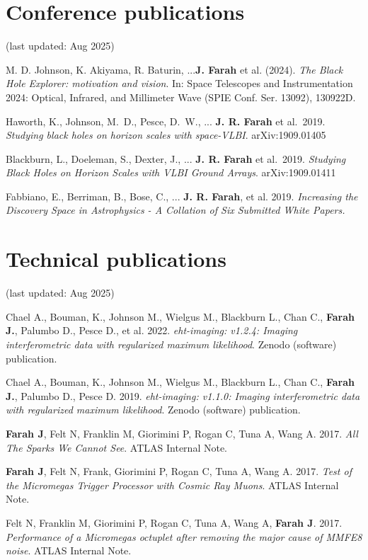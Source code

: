 \documentclass[margin,line]{res}
\begin{document}
\begin{resume}
\vspace{+.4cm}
\section{\sc Conference publications}
(last updated: Aug 2025)

M. D. Johnson, K. Akiyama, R. Baturin, ...\textbf{J. Farah} et al. (2024). \textit{The Black Hole Explorer: motivation and vision}. In: Space Telescopes and Instrumentation 2024: Optical, Infrared, and Millimeter Wave (SPIE Conf. Ser. 13092), 130922D.

Haworth, K., Johnson, M.~D., Pesce, D.~W., ... \textbf{J. R. Farah}  et al.\ 2019. \textit{Studying black holes on horizon scales with space-VLBI}. arXiv:1909.01405 

Blackburn, L., Doeleman, S., Dexter, J., ... \textbf{J. R. Farah} et al.\ 2019. \textit{Studying Black Holes on Horizon Scales with VLBI Ground Arrays}. arXiv:1909.01411 

Fabbiano, E., Berriman, B., Bose, C., ... \textbf{J. R. Farah}, et al. 2019. \textit{Increasing the Discovery Space in Astrophysics - A Collation of Six Submitted White Papers.} 


\vspace{+.4cm}
\section{\sc Technical publications}
(last updated: Aug 2025)

Chael A., Bouman, K., Johnson  M., Wielgus M., Blackburn L., Chan C., \textbf{Farah J.}, Palumbo D., Pesce D., et al. 2022. \textit{eht-imaging: v1.2.4: Imaging interferometric data with regularized maximum likelihood}. Zenodo (software) publication.

Chael A., Bouman, K., Johnson  M., Wielgus M., Blackburn L., Chan C., \textbf{Farah J.}, Palumbo D., Pesce D. 2019. \textit{eht-imaging: v1.1.0: Imaging interferometric data with regularized maximum likelihood}. Zenodo (software) publication.

\textbf{Farah J}, Felt N, Franklin M, Giorimini P, Rogan C, Tuna A, Wang A. 2017. \textit{All The Sparks We Cannot See}. ATLAS Internal Note.

\textbf{Farah J}, Felt N, Frank, Giorimini P, Rogan C, Tuna A, Wang A. 2017. \textit{Test of the Micromegas Trigger Processor with Cosmic Ray Muons}. ATLAS Internal Note.

Felt N, Franklin M, Giorimini P, Rogan C, Tuna A, Wang A, \textbf{Farah J}. 2017. \textit{Performance of a Micromegas octuplet after removing the major cause of MMFE8 noise}. ATLAS Internal Note.


\end{resume}
\end{document}
